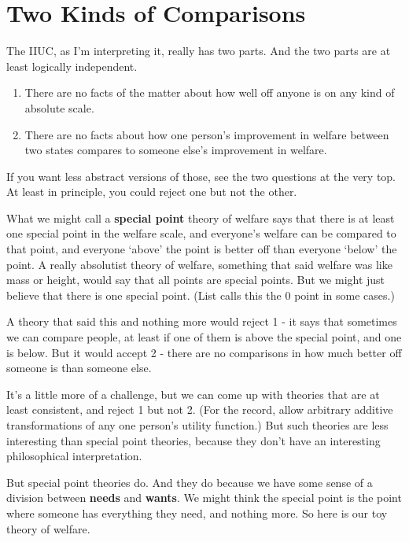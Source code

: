 \section{Two Kinds of Comparisons}
\label{twokindsofcomparisons}

The IIUC, as I'm interpreting it, really has two parts. And the two parts are at least logically independent.

\begin{enumerate}
\item{} There are no facts of the matter about how well off anyone is on any kind of absolute scale.

\item{} There are no facts about how one person's improvement in welfare between two states compares to someone else's improvement in welfare.

\end{enumerate}
If you want less abstract versions of those, see the two questions at the very top. At least in principle, you could reject one but not the other.

What we might call a \textbf{special point} theory of welfare says that there is at least one special point in the welfare scale, and everyone's welfare can be compared to that point, and everyone `above' the point is better off than everyone `below' the point. A really absolutist theory of welfare, something that said welfare was like mass or height, would say that all points are special points. But we might just believe that there is one special point. (List calls this the 0 point in some cases.)

A theory that said this and nothing more would reject 1 - it says that sometimes we can compare people, at least if one of them is above the special point, and one is below. But it would accept 2 - there are no comparisons in how much better off someone is than someone else.

It's a little more of a challenge, but we can come up with theories that are at least consistent, and reject 1 but not 2. (For the record, allow arbitrary additive transformations of any one person's utility function.) But such theories are less interesting than special point theories, because they don't have an interesting philosophical interpretation.

But special point theories do. And they do because we have some sense of a division between \textbf{needs} and \textbf{wants}. We might think the special point is the point where someone has everything they need, and nothing more. So here is our toy theory of welfare.

